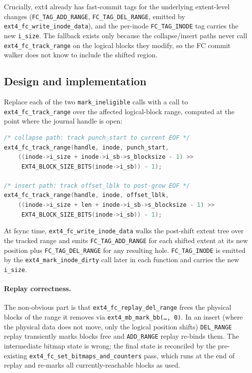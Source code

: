 \documentclass[11pt,a4paper]{article}
\begin{document}
Crucially, ext4 already has fast-commit tags for the underlying
extent-level changes
(\texttt{FC\_TAG\_ADD\_RANGE}, \texttt{FC\_TAG\_DEL\_RANGE},
emitted by \texttt{ext4\_fc\_write\_inode\_data}), and the
per-inode \texttt{FC\_TAG\_INODE} tag carries the new
\texttt{i\_size}. The fallback exists only because the
collapse/insert paths never call
\texttt{ext4\_fc\_track\_range} on the logical blocks they
modify, so the FC commit walker does not know to include the
shifted region.

\subsection{Design and implementation}

Replace each of the two \texttt{mark\_ineligible} calls with a
call to \texttt{ext4\_fc\_track\_range} over the affected
logical-block range, computed at the point where the journal
handle is open:

\begin{lstlisting}[language=C]
/* collapse path: track punch_start to current EOF */
ext4_fc_track_range(handle, inode, punch_start,
    ((inode->i_size + inode->i_sb->s_blocksize - 1) >>
     EXT4_BLOCK_SIZE_BITS(inode->i_sb)) - 1);

/* insert path: track offset_lblk to post-grow EOF */
ext4_fc_track_range(handle, inode, offset_lblk,
    ((inode->i_size + len + inode->i_sb->s_blocksize - 1) >>
     EXT4_BLOCK_SIZE_BITS(inode->i_sb)) - 1);
\end{lstlisting}

At fsync time, \texttt{ext4\_fc\_write\_inode\_data} walks the
post-shift extent tree over the tracked range and emits
\texttt{FC\_TAG\_ADD\_RANGE} for each shifted extent at its new
position plus \texttt{FC\_TAG\_DEL\_RANGE} for any resulting
hole. \texttt{FC\_TAG\_INODE} is emitted by the
\texttt{ext4\_mark\_inode\_dirty} call later in each function
and carries the new \texttt{i\_size}.

\paragraph{Replay correctness.} The non-obvious part is that
\texttt{ext4\_fc\_replay\_del\_range} frees the physical blocks
of the range it removes via \texttt{ext4\_mb\_mark\_bb(\ldots,
0)}. In an insert (where the physical data does not move, only
the logical position shifts) \texttt{DEL\_RANGE} replay
transiently marks blocks free and \texttt{ADD\_RANGE} replay
re-binds them. The intermediate bitmap state is wrong; the final
state is reconciled by the pre-existing
\texttt{ext4\_fc\_set\_bitmaps\_and\_counters} pass, which runs
at the end of replay and re-marks all currently-reachable blocks
as used.
\end{document}
